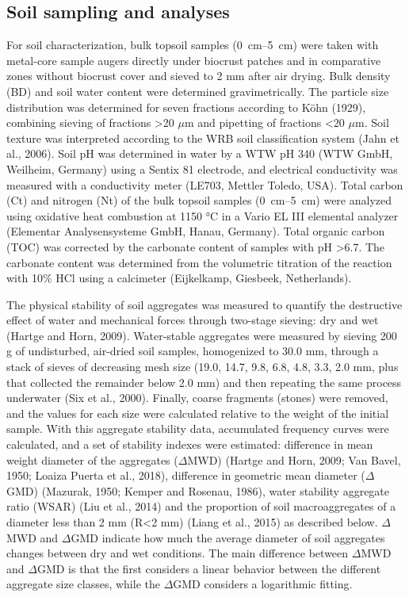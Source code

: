 {\FloatBarrier

\subsection{Soil sampling and analyses}

For soil characterization, bulk topsoil samples (\SIrange[range-phrase=--,range-units=single]{0}{5}{\centi\meter}) were taken with metal-core sample augers directly under biocrust patches and in comparative zones without biocrust cover and sieved to 2 mm after air drying. Bulk density (BD) and soil water content were determined gravimetrically. The particle size distribution was determined for seven fractions according to Köhn (1929), combining sieving of fractions >20 $\mu$m and pipetting of fractions <20 $\mu$m. Soil texture was interpreted according to the WRB soil classification system (Jahn et al., 2006). Soil pH was determined in water by a WTW pH 340 (WTW GmbH, Weilheim, Germany) using a Sentix 81 electrode, and electrical conductivity was measured with a conductivity meter (LE703, Mettler Toledo, USA). Total carbon (Ct) and nitrogen (Nt) of the bulk topsoil samples (\SIrange[range-phrase=--,range-units=single]{0}{5}{\centi\meter}) were analyzed using oxidative heat combustion at 1150 °C in a Vario EL III elemental analyzer (Elementar Analysensysteme GmbH, Hanau, Germany). Total organic carbon (TOC) was corrected by the carbonate content of samples with pH >6.7. The carbonate content was determined from the volumetric titration of the reaction with 10\% HCl using a calcimeter (Eijkelkamp, Giesbeek, Netherlands).

The physical stability of soil aggregates was measured to quantify the destructive effect of water and mechanical forces through two-stage sieving: dry and wet (Hartge and Horn, 2009). Water-stable aggregates were measured by sieving 200 g of undisturbed, air-dried soil samples, homogenized to 30.0 mm, through a stack of sieves of decreasing mesh size (19.0, 14.7, 9.8, 6.8, 4.8, 3.3, 2.0 mm, plus that collected the remainder below 2.0 mm) and then repeating the same process underwater (Six et al., 2000). Finally, coarse fragments (stones) were removed, and the values for each size were calculated relative to the weight of the initial sample. With this aggregate stability data, accumulated frequency curves were calculated, and a set of stability indexes were estimated: difference in mean weight diameter of the aggregates ($\Delta$MWD) (Hartge and Horn, 2009; Van Bavel, 1950; Loaiza Puerta et al., 2018), difference in geometric mean diameter ($\Delta$GMD) (Mazurak, 1950; Kemper and Rosenau, 1986), water stability aggregate ratio (WSAR) (Liu et al., 2014) and the proportion of soil macroaggregates of a diameter less than 2 mm (R<2 mm) (Liang et al., 2015) as described below. $\Delta$MWD and $\Delta$GMD indicate how much the average diameter of soil aggregates changes between dry and wet conditions. The main difference between $\Delta$MWD and $\Delta$GMD is that the first considers a linear behavior between the different aggregate size classes, while the $\Delta$GMD considers a logarithmic fitting.

}
